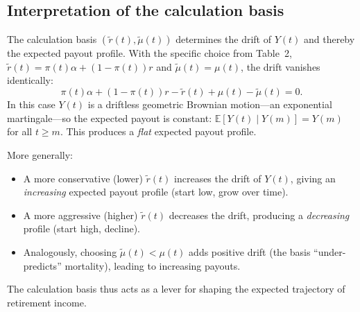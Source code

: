 \subsection*{Interpretation of the calculation basis}

The calculation basis $(\tilde{r}(t),\tilde{\mu}(t))$ determines the drift of $Y(t)$
and thereby the expected payout profile.
With the specific choice from Table~2, $\tilde{r}(t) = \pi(t)\alpha+(1-\pi(t))r$
and $\tilde{\mu}(t) = \mu(t)$, the drift vanishes identically:
\[
  \pi(t)\alpha + (1-\pi(t))r - \tilde{r}(t) + \mu(t) - \tilde{\mu}(t) = 0.
\]
In this case $Y(t)$ is a driftless geometric Brownian motion---an exponential
martingale---so the expected payout is constant:
$\mathbb{E}[Y(t)\mid Y(m)] = Y(m)$ for all $t \geq m$.
This produces a \emph{flat} expected payout profile.

More generally:
\begin{itemize}
  \item A more conservative (lower) $\tilde{r}(t)$ increases the drift of $Y(t)$,
    giving an \emph{increasing} expected payout profile (start low, grow over time).
  \item A more aggressive (higher) $\tilde{r}(t)$ decreases the drift, producing
    a \emph{decreasing} profile (start high, decline).
  \item Analogously, choosing $\tilde{\mu}(t) < \mu(t)$ adds positive drift (the
    basis ``under-predicts'' mortality), leading to increasing payouts.
\end{itemize}
The calculation basis thus acts as a lever for shaping the expected trajectory
of retirement income.

